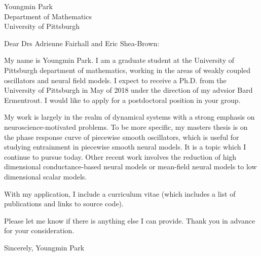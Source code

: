 \documentclass[a4paper,11pt]{letter}
\begin{document}
\begin{letter}{Youngmin Park \\ Department of Mathematics\\ University of Pittsburgh}
 

\opening{Dear Drs Adrienne Fairhall and Eric Shea-Brown:}

My name is Youngmin Park. I am a graduate student at the University of Pittsburgh department of mathematics, working in the areas of weakly coupled oscillators and neural field models. I expect to receive a Ph.D. from the University of Pittsburgh in May of 2018 under the direction of my advsior Bard Ermentrout. I would like to apply for a postdoctoral position in your group.

My work is largely in the realm of dynamical systems with a strong emphasis on neuroscience-motivated problems. To be more specific, my masters thesis is on the phase response curve of piecewise smooth oscillators, which is useful for studying entrainment in piecewise smooth neural models. It is a topic which I continue to pursue today. Other recent work involves the reduction of high dimensional conductance-based neural models or mean-field neural models to low dimensional scalar models.

With my application, I include a curriculum vitae (which includes a list of publications and links to source code).

Please let me know if there is anything else I can provide. Thank you in advance for your consideration.

Sincerely,
Youngmin Park
 
 
 
\end{letter}
\end{document}
